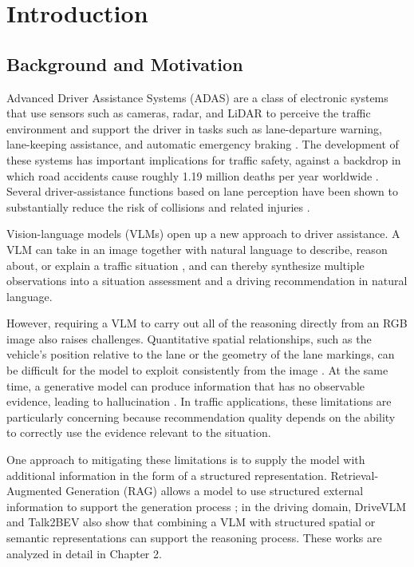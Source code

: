 \documentclass[12pt,a4paper]{report}
\begin{document}
\clearpage
{}
\setcounter{page}{1}

\chapter{Introduction}

\section{Background and Motivation}

Advanced Driver Assistance Systems (ADAS) are a class of electronic systems that use sensors such as cameras, radar, and LiDAR to perceive the traffic environment and support the driver in tasks such as lane-departure warning, lane-keeping assistance, and automatic emergency braking \cite{nidamanuri2022adas}. The development of these systems has important implications for traffic safety, against a backdrop in which road accidents cause roughly 1.19 million deaths per year worldwide \cite{who2023roadsafety}. Several driver-assistance functions based on lane perception have been shown to substantially reduce the risk of collisions and related injuries \cite{iihs2017lanedeparture}.

Vision-language models (VLMs) open up a new approach to driver assistance. A VLM can take in an image together with natural language to describe, reason about, or explain a traffic situation \cite{xu2024drivegpt4,rivera2025scenario}, and can thereby synthesize multiple observations into a situation assessment and a driving recommendation in natural language.

However, requiring a VLM to carry out all of the reasoning directly from an RGB image also raises challenges. Quantitative spatial relationships, such as the vehicle's position relative to the lane or the geometry of the lane markings, can be difficult for the model to exploit consistently from the image \cite{tong2024eyeswideshut,kamath2023whatsup}. At the same time, a generative model can produce information that has no observable evidence, leading to hallucination \cite{ji2023hallucination,li2023pope}. In traffic applications, these limitations are particularly concerning because recommendation quality depends on the ability to correctly use the evidence relevant to the situation.

One approach to mitigating these limitations is to supply the model with additional information in the form of a structured representation. Retrieval-Augmented Generation (RAG) allows a model to use structured external information to support the generation process \cite{lewis2020rag}; in the driving domain, DriveVLM \cite{tian2024drivevlm} and Talk2BEV \cite{choudhary2024talk2bev} also show that combining a VLM with structured spatial or semantic representations can support the reasoning process. These works are analyzed in detail in Chapter 2.
\end{document}
